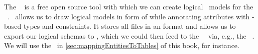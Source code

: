 %
%
\label{sec:installingPgModeler}%
%
The \pgmodeler~\cite{AES2006PPDM} is a free open source tool with which we can create logical \db\ models for the \dbms\ \postgresql.
\pgmodeler\ allows us to draw logical models in form of  while annotating attributes with \sql-based types and constraints.
It stores all files in an  format and allows us to export our logical schemas to \sql, which we could then feed to the \postgresql\ \dbms\ via, e.g., the \psql\ .
We will use the \pgmodeler\ in \cref{sec:mappingEntitiesToTables} of this book, for instance.%
%
%
%
%
\endhsection%
%

